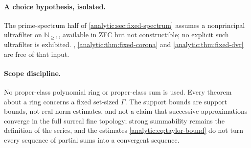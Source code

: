 \documentclass[11pt,letterpaper]{article}
\theoremstyle{definition}
\theoremstyle{remark}
\newcommand{\N}{\mathbb N}
\numberwithin{equation}{section}
\begin{document}
\paragraph{A choice hypothesis, isolated.}
The prime-spectrum half of \cref{analytic:sec:fixed-spectrum} assumes a
nonprincipal ultrafilter on $\N_{\ge1}$, available in ZFC but not
constructible; no explicit such ultrafilter is exhibited.
, \cref{analytic:thm:fixed-corona} and
\cref{analytic:thm:fixed-dvr} are free of that input.

\paragraph{Scope discipline.}
No proper-class polynomial ring or proper-class sum is used. Every theorem
about a ring concerns a fixed set-sized $\Gamma$. The support bounds are
support bounds, not real norm estimates, and not a claim that successive
approximations converge in the full surreal fine topology; strong
summability remains the definition of the series, and the estimates
\eqref{analytic:eq:taylor-bound} do not turn every sequence of partial sums
into a convergent sequence.
\end{document}
